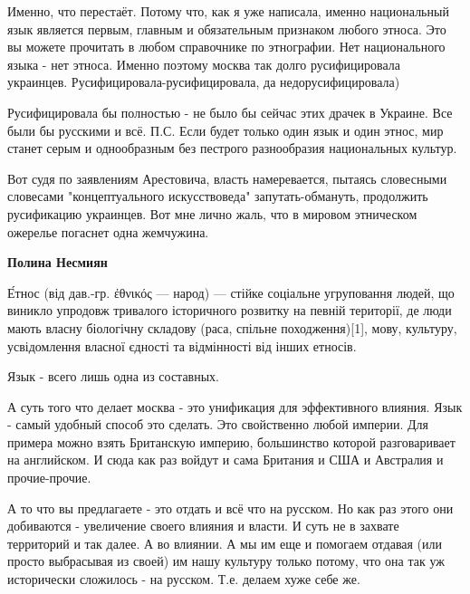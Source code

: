 \begin{itemize}
\begin{itemize}
Именно, что перестаёт. Потому что, как я уже написала, именно национальный язык
является первым, главным и обязательным признаком любого этноса. Это вы можете
прочитать в любом справочнике по этнографии. Нет национального языка - нет
этноса. Именно поэтому москва так долго русифицировала украинцев.
Русифицировала-русифицировала, да недорусифицировала)

Русифицировала бы полностью - не было бы сейчас этих драчек в Украине. Все были
бы русскими и всё. П.С. Если будет только один язык и один этнос, мир станет
серым и однообразным без пестрого разнообразия национальных культур. 

Вот судя по заявлениям Арестовича, власть намеревается, пытаясь словесными
словесами "концептуального искусствоведа" запутать-обмануть, продолжить
русификацию украинцев. Вот мне лично жаль, что в мировом этническом ожерелье
погаснет одна жемчужина.

 
\textbf{Полина Несмиян} 

Е́тнос (від дав.-гр. ἐθνικός — народ) — стійке соціальне угруповання людей, що
виникло упродовж тривалого історичного розвитку на певній території, де люди
мають власну біологічну складову (раса, спільне походження)[1], мову, культуру,
усвідомлення власної єдності та відмінності від інших етносів.

Язык - всего лишь одна из составных.

А суть того что делает москва - это унификация для эффективного влияния. Язык -
самый удобный способ это сделать. Это свойственно любой империи. Для примера
можно взять Британскую империю, большинство которой разговаривает на
английском. И сюда как раз войдут и сама Британия и США и Австралия и
прочие-прочие.

А то что вы предлагаете - это отдать и всё что на русском. Но как раз этого они
добиваются - увеличение своего влияния и власти. И суть не в захвате территорий
и так далее. А во влиянии. А мы им еще и помогаем отдавая (или просто
выбрасывая из своей) им нашу культуру только потому, что она так уж исторически
сложилось - на русском. Т.е. делаем хуже себе же.

 

\end{itemize}
\end{itemize}

